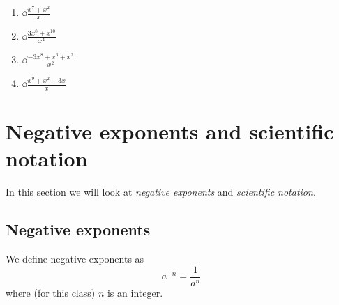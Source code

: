 \begin{multicols}{2}
	\begin{enumerate}
		\item $\dd \frac{x^7+x^2}{x}$
		\item $\dd \frac{3x^8+x^{10}}{x^4}$
		\item $\dd \frac{-3x^8+x^6+x^2}{x^2}$
		\item $\dd \frac{x^9+x^2+3x}{x}$
	\end{enumerate}
\end{multicols}

\section{Negative exponents and scientific notation}
%
In this section we will look
at {\em negative exponents} and {\em scientific notation}.

\subsection{Negative exponents}
We define negative exponents as
\[
	a^{-n} = \frac{1}{a^n}
\]	
where (for this class) $n$ is an integer.

